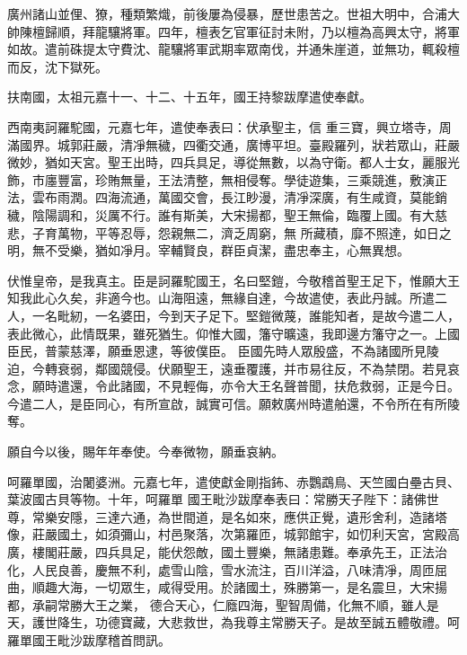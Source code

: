 \begin{pinyinscope}
 廣州諸山並俚、獠，種類繁熾，前後屢為侵暴，歷世患苦之。世祖大明中，合浦大帥陳檀歸順，拜龍驤將軍。四年，檀表乞官軍征討未附，乃以檀為高興太守，將軍如故。遣前硃提太守費沈、龍驤將軍武期率眾南伐，并通朱崖道，並無功，輒殺檀而反，沈下獄死。



 扶南國，太祖元嘉十一、十二、十五年，國王持黎跋摩遣使奉獻。



 西南夷訶羅駝國，元嘉七年，遣使奉表曰：伏承聖主，信
 重三寶，興立塔寺，周滿國界。城郭莊嚴，清凈無穢，四衢交通，廣博平坦。臺殿羅列，狀若眾山，莊嚴微妙，猶如天宮。聖王出時，四兵具足，導從無數，以為守衛。都人士女，麗服光飾，市廛豐富，珍賄無量，王法清整，無相侵奪。學徒遊集，三乘競進，敷演正法，雲布雨潤。四海流通，萬國交會，長江眇漫，清凈深廣，有生咸資，莫能銷穢，陰陽調和，災厲不行。誰有斯美，大宋揚都，聖王無倫，臨覆上國。有大慈悲，子育萬物，平等忍辱，怨親無二，濟乏周窮，無
 所藏積，靡不照達，如日之明，無不受樂，猶如凈月。宰輔賢良，群臣貞潔，盡忠奉主，心無異想。



 伏惟皇帝，是我真主。臣是訶羅駝國王，名曰堅鎧，今敬稽首聖王足下，惟願大王知我此心久矣，非適今也。山海阻遠，無緣自達，今故遣使，表此丹誠。所遣二人，一名毗紉，一名婆田，今到天子足下。堅鎧微蔑，誰能知者，是故今遣二人，表此微心，此情既果，雖死猶生。仰惟大國，籓守曠遠，我即邊方籓守之一。上國臣民，普蒙慈澤，願垂恩逮，等彼僕臣。
 臣國先時人眾殷盛，不為諸國所見陵迫，今轉衰弱，鄰國競侵。伏願聖王，遠垂覆護，并市易往反，不為禁閉。若見哀念，願時遣還，令此諸國，不見輕侮，亦令大王名聲普聞，扶危救弱，正是今日。今遣二人，是臣同心，有所宣啟，誠實可信。願敕廣州時遣舶還，不令所在有所陵奪。



 願自今以後，賜年年奉使。今奉微物，願垂哀納。



 呵羅單國，治闍婆洲。元嘉七年，遣使獻金剛指鈽、赤鸚鵡鳥、天竺國白壘古貝、葉波國古貝等物。十年，呵羅單
 國王毗沙跋摩奉表曰：常勝天子陛下：諸佛世尊，常樂安隱，三達六通，為世間道，是名如來，應供正覺，遺形舍利，造諸塔像，莊嚴國土，如須彌山，村邑聚落，次第羅匝，城郭館宇，如忉利天宮，宮殿高廣，樓閣莊嚴，四兵具足，能伏怨敵，國土豐樂，無諸患難。奉承先王，正法治化，人民良善，慶無不利，處雪山陰，雪水流注，百川洋溢，八味清凈，周匝屈曲，順趣大海，一切眾生，咸得受用。於諸國土，殊勝第一，是名震旦，大宋揚都，承嗣常勝大王之業，
 德合天心，仁廕四海，聖智周備，化無不順，雖人是天，護世降生，功德寶藏，大悲救世，為我尊主常勝天子。是故至誠五體敬禮。呵羅單國王毗沙跋摩稽首問訊。




\end{pinyinscope}
